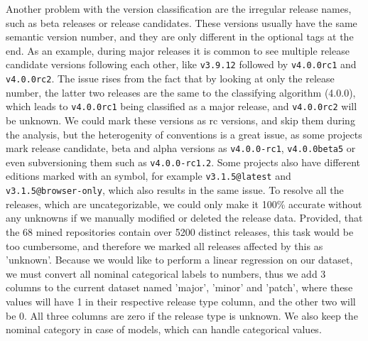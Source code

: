 Another problem with the version classification are the irregular release names, such as beta releases or release candidates. These versions usually have the same semantic version number, and they are only different in the optional tags at the end. As an example, during major releases it is common to see multiple release candidate versions following each other, like \texttt{v3.9.12} followed by \texttt{v4.0.0rc1} and \texttt{v4.0.0rc2}. The issue rises from the fact that by looking at only the release number, the latter two releases are the same to the classifying algorithm (4.0.0), which leads to \texttt{v4.0.0rc1} being classified as a major release, and \texttt{v4.0.0rc2} will be unknown. We could mark these versions as rc versions, and skip them during the analysis, but the heterogenity of conventions is a great issue, as some projects mark release candidate, beta and alpha versions as \texttt{v4.0.0-rc1}, \texttt{v4.0.0beta5} or even subversioning them such as \texttt{v4.0.0-rc1.2}. Some projects also have different editions marked with an \@ symbol, for example \texttt{v3.1.5@latest} and \texttt{v3.1.5@browser-only}, which also results in the same issue. To resolve all the releases, which are uncategorizable, we could only make it 100\% accurate without any unknowns if we manually modified or deleted the release data. Provided, that the 68 mined repositories contain over 5200 distinct releases, this task would be too cumbersome, and therefore we marked all releases affected by this as 'unknown'. Because we would like to perform a linear regression on our dataset, we must convert all nominal categorical labels to numbers, thus we add 3 columns to the current dataset named 'major', 'minor' and 'patch', where these values will have 1 in their respective release type column, and the other two will be 0. All three columns are zero if the release type is unknown. We also keep the nominal category in case of models, which can handle categorical values.

